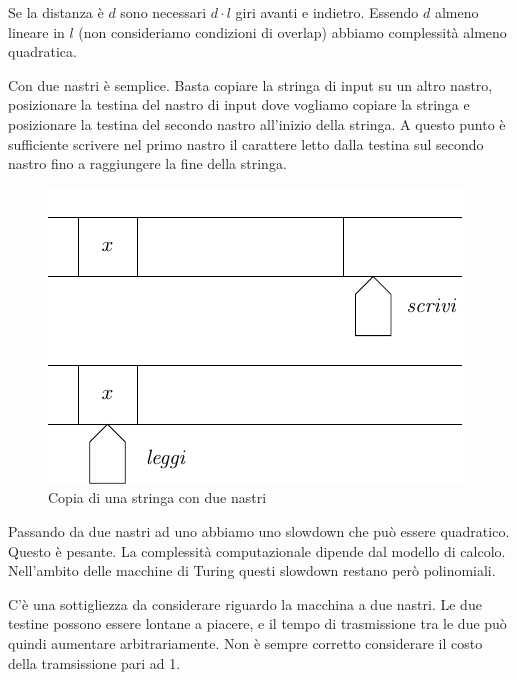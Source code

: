 Se la distanza è $d$ sono necessari $d\cdot l$ giri avanti e indietro. Essendo $d$ almeno lineare in $l$
(non consideriamo condizioni di overlap) abbiamo complessità almeno quadratica.

Con due nastri è semplice. Basta copiare la stringa di input su un altro nastro, posizionare la
testina del nastro di input dove vogliamo copiare la stringa e posizionare la testina del secondo
nastro all'inizio della stringa. A questo punto è sufficiente scrivere nel primo nastro il
carattere letto dalla testina sul secondo nastro fino a raggiungere la fine della stringa.

\begin{figure}[h]
    \begin{center}
        \includegraphics{./img/deterministic_complexity_classes/CopyString2Tapes.pdf}
        \caption{Copia di una stringa con due nastri}
    \end{center}
\end{figure}

Passando da due nastri ad uno abbiamo uno slowdown che può essere quadratico. Questo è pesante. La
complessità computazionale dipende dal modello di calcolo. Nell'ambito delle macchine di Turing
questi slowdown restano però polinomiali.

C'è una sottigliezza da considerare riguardo la macchina a due nastri. Le due testine possono
essere lontane a piacere, e il tempo di trasmissione tra le due può quindi aumentare
arbitrariamente. Non è sempre corretto considerare il costo della tramsissione pari ad 1.



